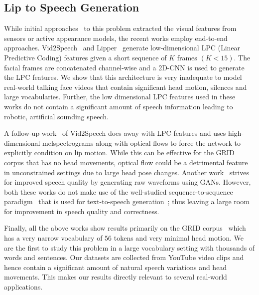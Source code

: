 \documentclass[10pt,twocolumn,letterpaper]{article}
\begin{document}
\subsection{Lip to Speech Generation}
While initial approaches~\cite{le2017generating,kello2004neural} to this problem extracted the visual features from sensors or active appearance models, the recent works employ end-to-end approaches. Vid2Speech~\cite{ephrat2017vid2speech} and Lipper~\cite{kumar2019lipper} generate low-dimensional LPC (Linear Predictive Coding) features given a short sequence of $K$ frames $(K < 15)$. The facial frames are concatenated channel-wise and a 2D-CNN is used to generate the LPC features. We show that this architecture is very inadequate to model real-world talking face videos that contain significant head motion, silences and large vocabularies. Further, the low dimensional LPC features used in these works do not contain a significant amount of speech information leading to robotic, artificial sounding speech. 

A follow-up work~\cite{Ephrat2017ImprovedSR} of Vid2Speech does away with LPC features and uses high-dimensional melspectrograms along with optical flows to force the network to explicitly condition on lip motion. While this can be effective for the GRID corpus that has no head movements, optical flow could be a detrimental feature in unconstrained settings due to large head pose changes. Another work~\cite{vougioukas2019video} strives for improved speech quality by generating raw waveforms using GANs. However, both these works do not make use of the well-studied sequence-to-sequence paradigm~\cite{sutskever2014sequence} that is used for text-to-speech generation~\cite{shen2018natural}; thus leaving a large room for improvement in speech quality and correctness. 

Finally, all the above works show results primarily on the GRID corpus~\cite{cooke2006audio} which has a very narrow vocabulary of $56$ tokens and very minimal head motion. We are the first to study this problem in a large vocabulary setting with thousands of words and sentences. Our datasets are collected from YouTube video clips and hence contain a significant amount of natural speech variations and head movements. This makes our results directly relevant to several real-world applications.
\end{document}
